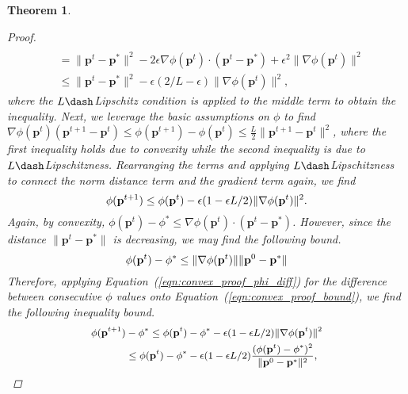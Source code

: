 \documentclass[conference]{IEEEtran}
\newcommand{\1}[1]{\mathds{1}\left[#1\right]}
\theoremstyle{plain}
\newtheorem{theorem}{Theorem}
\begin{document}
\begin{theorem}
{\begin{proof}
\begin{equation}
\begin{split}
            \\&= \lVert\mathbf{p}^{t}-\mathbf{p}^*\rVert^2 -2\epsilon\nabla\phi(\mathbf{p}^{t})\cdot(\mathbf{p}^{t} - \mathbf{p}^*) + \epsilon^2\lVert\nabla\phi(\mathbf{p}^{t})\rVert^2
            \\&\leq \lVert\mathbf{p}^{t}-\mathbf{p}^*\rVert^2 - \epsilon(2/L - \epsilon)\lVert\nabla\phi(\mathbf{p}^{t})\rVert^2,
        \end{split}
        \end{equation}
        where the $L\dash$Lipschitz condition is applied to the middle term to obtain the inequality. Next, we leverage the basic assumptions on $\phi$ to find $\nabla\phi(\mathbf{p}^t)(\mathbf{p}^{t+1} - \mathbf{p}^t) \leq \phi(\mathbf{p}^{t+1}) - \phi(\mathbf{p}^t) \leq \frac{L}{2}\lVert \mathbf{p}^{t+1} - \mathbf{p}^{t}\rVert^2$, where the first inequality holds due to convexity while the second inequality is due to $L\dash$Lipschitzness. Rearranging the terms and applying $L\dash$Lipschitzness to connect the norm distance term and the gradient term again, we find 
        \begin{equation}\small
            \label{eqn:convex_proof_phi_diff}
            \phi(\mathbf{p}^{t+1}) \leq \phi(\mathbf{p}^t) - \epsilon(1-\epsilon L/2)\lVert\nabla\phi(\mathbf{p}^t)\rVert^2.
        \end{equation}
        Again, by convexity, $\phi(\mathbf{p}^t) - \phi^* \leq \nabla\phi(\mathbf{p}^t)\cdot (\mathbf{p}^t-\mathbf{p}^*)$. However, since the distance $\lVert\mathbf{p}^t- \mathbf{p}^*\rVert$ is decreasing, we may find the following bound.
        \begin{equation}\small
            \label{eqn:convex_proof_bound}
            \phi(\mathbf{p}^t) - \phi^* \leq \lVert\nabla\phi(\mathbf{p}^t)\rVert\lVert\mathbf{p}^0-\mathbf{p}^*\rVert
        \end{equation}
        Therefore, applying Equation~(\ref{eqn:convex_proof_phi_diff}) for the difference between consecutive $\phi$ values onto Equation~(\ref{eqn:convex_proof_bound}), we find the following inequality bound.
        \begin{equation}\small
        \begin{split}
            \phi(\mathbf{p}^{t+1}) &- \phi^* \leq \phi(\mathbf{p}^t) - \phi^* - \epsilon(1-\epsilon L/2)\lVert\nabla\phi(\mathbf{p}^t)\rVert^2
            \\&\leq 
            \phi(\mathbf{p}^t) - \phi^* - \epsilon(1-\epsilon L/2)
            \frac{(\phi(\mathbf{p}^t) - \phi^*)^2}{\lVert\mathbf{p}^0-\mathbf{p}^*\rVert^2},

\end{split}
\end{equation}
\end{proof}}
\end{theorem}
\end{document}
